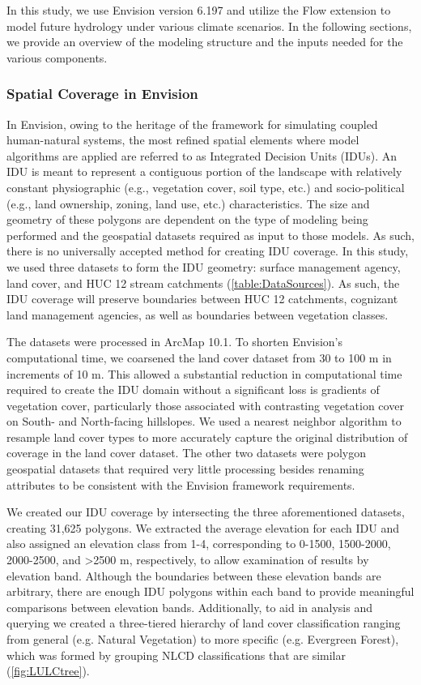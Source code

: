 \documentclass[water,article,submit,moreauthors,pdftex,10pt,a4paper]{mdpi}
\theoremstyle{mdpi}
\newcounter{thm}
\newcounter{ex}
\newcounter{re}
\theoremstyle{mdpidefinition}
\begin{document}
In this study, we use Envision version 6.197 and utilize the Flow extension to model future hydrology under various climate scenarios. In the following sections, we provide an overview of the modeling structure and the inputs needed for the various components.

\subsubsection{Spatial Coverage in Envision}

In Envision, owing to the heritage of the framework for simulating coupled human-natural systems, the most refined spatial elements where model algorithms are applied are referred to as Integrated Decision Units (IDUs). An IDU is meant to represent a contiguous portion of the landscape with relatively constant physiographic (e.g., vegetation cover, soil type, etc.) and socio-political (e.g., land ownership, zoning, land use, etc.) characteristics.  The size and geometry of these polygons are dependent on the type of modeling being performed and the geospatial datasets required as input to those models. As such, there is no universally accepted method for creating IDU coverage. In this study, we used three datasets to form the IDU geometry: surface management agency, land cover, and HUC 12 stream catchments (\cref{table:DataSources}). As such, the IDU coverage will preserve boundaries between HUC 12 catchments, cognizant land management agencies, as well as boundaries between vegetation classes.  

The datasets were processed in ArcMap 10.1. To shorten Envision's computational time, we coarsened the land cover dataset from 30 to 100 m in increments of 10 m. This allowed a substantial reduction in computational time required to create the IDU domain without a significant loss is gradients of vegetation cover, particularly those associated with contrasting vegetation cover on South- and North-facing hillslopes. We used a nearest neighbor algorithm to resample land cover types to more accurately capture the original distribution of coverage in the land cover dataset. The other two datasets were polygon geospatial datasets that required very little processing besides renaming attributes to be consistent with the Envision framework requirements.

We created our IDU coverage by intersecting the three aforementioned datasets, creating 31,625 polygons. We extracted the average elevation for each IDU and also assigned an elevation class from 1-4, corresponding to 0-1500, 1500-2000, 2000-2500, and >2500 m, respectively, to allow examination of results by elevation band. Although the boundaries between these elevation bands are arbitrary, there are enough IDU polygons within each band to provide meaningful comparisons between elevation bands. Additionally, to aid in analysis and querying we created a three-tiered hierarchy of land cover classification ranging from general (e.g. Natural Vegetation) to more specific (e.g. Evergreen Forest), which was formed by grouping NLCD classifications that are similar (\cref{fig:LULCtree}).
\end{document}
